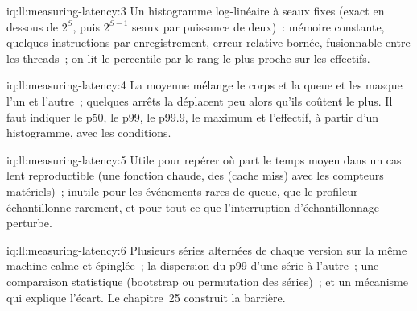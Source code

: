 \begin{solution}{iq:ll:measuring-latency:3}
Un histogramme log-linéaire à seaux fixes (exact en dessous de $2^S$, puis $2^{S-1}$ seaux par puissance de deux)~: mémoire constante,
quelques instructions par enregistrement, erreur relative bornée, fusionnable entre les threads~; on lit le percentile par le rang le plus proche
sur les effectifs.
\end{solution}

\begin{solution}{iq:ll:measuring-latency:4}
La moyenne mélange le corps et la queue et les masque l'un et l'autre~; quelques arrêts la déplacent peu alors qu'ils coûtent le plus. Il faut indiquer le p50,
le p99, le p99.9, le maximum et l'effectif, à partir d'un histogramme, avec les conditions.
\end{solution}

\begin{solution}{iq:ll:measuring-latency:5}
Utile pour repérer où part le temps moyen dans un cas lent reproductible (une fonction chaude, des  (cache miss) avec les
compteurs matériels)~; inutile pour les événements rares de queue, que le profileur échantillonne rarement, et pour tout ce que l'interruption d'échantillonnage perturbe.
\end{solution}

\begin{solution}{iq:ll:measuring-latency:6}
Plusieurs séries alternées de chaque version sur la même machine calme et épinglée~; la dispersion du p99 d'une série à l'autre~; une
comparaison statistique (bootstrap ou permutation des séries)~; et un mécanisme qui explique l'écart. Le chapitre~25 construit
la barrière.
\end{solution}
